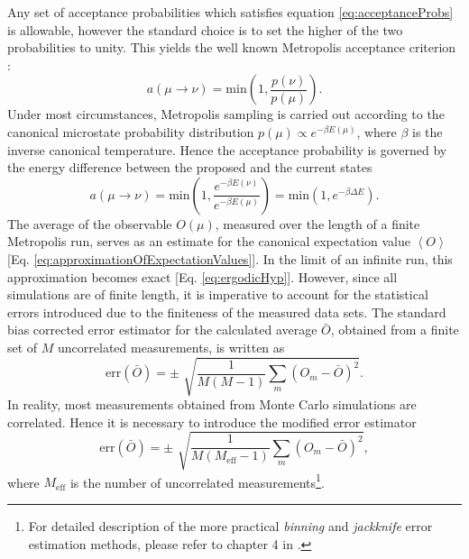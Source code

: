 \documentclass[12pt]{report}
\begin{document}
Any set of acceptance probabilities which satisfies equation \ref{eq:acceptanceProbs} is allowable, however the standard choice is to set the higher of the two probabilities to unity. This yields the well known Metropolis acceptance criterion \cite{Landau2000,Metropolis1953}:
%
\begin{equation}
\label{eq:MetropolisCriterion}
a\left(\mu \rightarrow \nu\right) = \mathrm{min}\left(1,\frac{p\left(\nu\right)}{p\left(\mu\right)} \right).
\end{equation}
% 
Under most circumstances, Metropolis sampling is carried out according to the canonical microstate probability distribution $p(\mu) \propto e^{-\beta E(\mu)}$, where $\beta$ is the inverse canonical temperature. Hence the acceptance probability is governed by the energy difference between the proposed and the current states
%
\begin{equation}
\label{eq:MetropolisCriterionCanonical}
a\left(\mu \rightarrow \nu\right) = \mathrm{min}\left(1,\frac{e^{-\beta E(\nu)}}{e^{-\beta E(\mu)}} \right) = \mathrm{min}\left(1,e^{-\beta \Delta E} \right).
\end{equation}
%
The average of the observable $O(\mu)$, measured over the length of a finite Metropolis run, serves as an estimate for the canonical expectation value $\left\langle O \right\rangle$ [Eq.\,\,\ref{eq:approximationOfExpectationValues}]. 
In the limit of an infinite run, this approximation becomes exact [Eq.\,\,\ref{eq:ergodicHyp}]. However, since all simulations are of finite length, it is imperative to account for the statistical errors introduced due to the finiteness of the measured data sets. The standard bias corrected error estimator for the calculated average $\bar{O}$, obtained from a finite set of $M$ uncorrelated measurements, is written as
%
\begin{equation}
\mathrm{err}(\bar{O}) = \pm \,\,\sqrt{\frac{1}{M(M-1)} \sum_{m} (O_{m} - \bar{O})^{2}}.
\end{equation}
%
In reality, most measurements obtained from Monte Carlo simulations are correlated. Hence it is necessary to introduce the modified error estimator
%
\begin{equation}
\mathrm{err}(\bar{O}) = \pm \,\,\sqrt{\frac{1}{M(M_{\mathrm{eff}}-1)} \sum_{m} (O_{m} - \bar{O})^{2}},
\end{equation}
%
where $M_{\mathrm{eff}}$ is the number of uncorrelated measurements\footnote{For detailed description of the more practical \textit{binning} and \textit{jackknife} error estimation methods, please refer to chapter 4 in \cite{Bachmann2014}.}.
\end{document}
